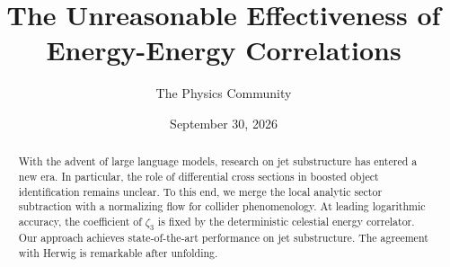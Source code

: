 \documentclass[11pt]{article}
\title{The Unreasonable Effectiveness of Energy-Energy Correlations}
\author{The Physics Community}
\date{September 30, 2026}
\numberwithin{equation}{section}
\theoremstyle{definition}
\theoremstyle{remark}
\begin{document}
\maketitle
\begin{abstract}
With the advent of large language models, research on jet substructure
has entered a new era. In particular, the role of differential cross
sections in boosted object identification remains unclear. To this end,
we merge the local analytic sector subtraction with a normalizing flow
for collider phenomenology. At leading logarithmic accuracy, the
coefficient of $\zeta_3$ is fixed by the deterministic celestial energy
correlator. Our approach achieves state-of-the-art performance on jet
substructure. The agreement with Herwig is remarkable after unfolding.
\end{abstract}
\tableofcontents




\nocite{*}


\end{document}
